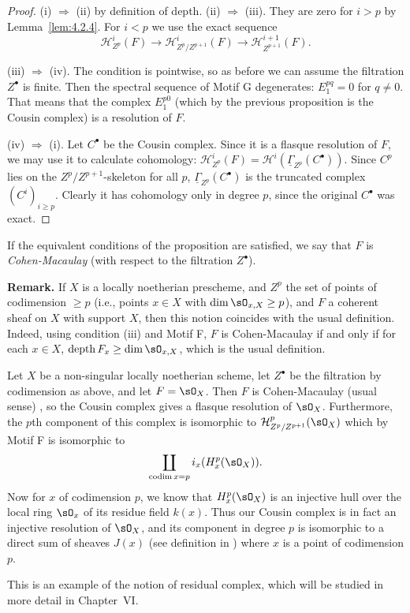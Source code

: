 \begin{proof}
(i) $\Longrightarrow$ (ii) by definition of depth. (ii) $\Longrightarrow$ (iii). They are zero for $i>p$ by Lemma~\ref{lem:4.2.4}. For $i<p$ we use the exact sequence
\[
\mathcal{H}_{Z^{p}}^{i}(F)\longrightarrow \mathcal{H}_{Z^{p}/Z^{p+1}}^{i}(F)\longrightarrow \mathcal{H}_{Z^{p+1}}^{i+1}(F).
\]

(iii) $\Longrightarrow$ (iv). The condition is pointwise, so as before we can assume the filtration $Z^\bullet$ is finite. Then the spectral sequence of Motif G degenerates: $E_1^{pq}=0$ for $q\neq 0$. That means that the complex $E_1^{p0}$ (which by the previous proposition is the Cousin complex) is a resolution of $F$.

(iv) $\Longrightarrow$ (i). Let $C^\bullet$ be the Cousin complex. Since it is a flasque resolution of $F$, we may use it to calculate cohomology: $\mathcal{H}_{Z^p}^{i}(F)=\mathcal{H}^i(\underline{\Gamma}_{Z^p}(C^\bullet))$. Since $C^p$ lies on the $Z^p/Z^{p+1}$-skeleton for all $p$, $\underline{\Gamma}_{Z^p}(C^\bullet)$ is the truncated complex $(C^i)_{i\geq p}$. Clearly it has cohomology only in degree $p$, since the original $C^\bullet$ was exact.
\end{proof}

\begin{definition*}
If the equivalent conditions of the proposition are satisfied, we say that $F$ is \emph{Cohen-Macaulay} (with respect to the filtration $Z^\bullet$).
\end{definition*}

\par\medskip\noindent\textbf{Remark.}
If $X$ is a locally noetherian prescheme, and $Z^p$ the set of points of codimension $\geq p$ (i.e., points $x\in X$ with $\dim\sO_{x,X}\geq p$), and $F$ a coherent sheaf on $X$ with support $X$, then this notion coincides with the usual definition. Indeed, using condition (iii) and Motif F, $F$ is Cohen-Macaulay if and only if for each $x\in X$, $\operatorname{depth}F_x\geq\dim\sO_{x,X}$, which is the usual definition.
\par\medskip

\begin{example*}
Let $X$ be a non-singular locally noetherian scheme, let $Z^\bullet$ be the filtration by codimension as above, and let $F=\sO_X$. Then $F$ is Cohen-Macaulay (usual sense) \cite[\nopp vol.~II, App.~6]{ZS}, so the Cousin complex gives a flasque resolution of $\sO_X$. Furthermore, the $p$th component of this complex is isomorphic to $\mathcal{H}_{Z^p/Z^{p+1}}^{p}(\sO_X)$ which by Motif F is isomorphic to
\[
\coprod_{\operatorname{codim} x = p} i_x(H_x^{p}(\sO_X)).
\]
Now for $x$ of codimension $p$, we know \cite[]{LC} that $H_x^p(\sO_X)$ is an injective hull over the local ring $\sO_x$ of its residue field $k(x)$. Thus our Cousin complex is in fact an injective resolution of $\sO_X$, and its component in degree $p$ is isomorphic to a direct sum of sheaves $J(x)$ (see definition in ) where $x$ is a point of codimension $p$.

This is an example of the notion of residual complex, which will be studied in more detail in Chapter~VI.
\end{example*}

